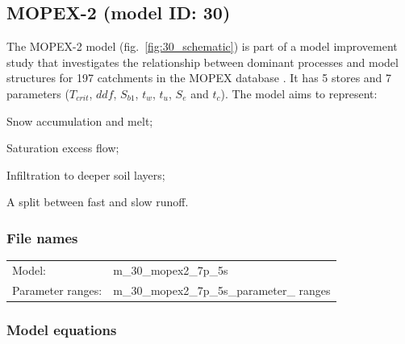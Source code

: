 \subsection{MOPEX-2 (model ID: 30)}
The MOPEX-2 model (fig.~\ref{fig:30_schematic}) is part of a model improvement study that investigates the relationship between dominant processes and model structures for 197 catchments in the MOPEX database \citep{Ye2012}. It has 5 stores and 7 parameters ($T_{crit}$, $ddf$, $S_{b1}$, $t_w$, $t_u$, $S_e$ and $t_c$). The model aims to represent:

\begin{itemizecompact}
\item Snow accumulation and melt;
\item Saturation excess flow;
\item Infiltration to deeper soil layers;
\item A split between fast and slow runoff.
\end{itemizecompact}

\subsubsection{File names}
\begin{tabular}{@{}ll}
Model: &m\_30\_mopex2\_7p\_5s \\
Parameter ranges: &m\_30\_mopex2\_7p\_5s\_parameter\_ ranges \\
\end{tabular}

\subsubsection{Model equations}

